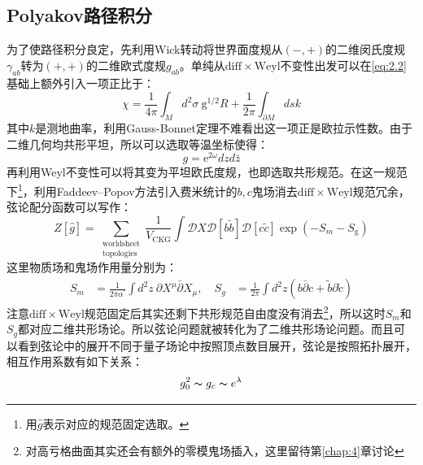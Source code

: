 \subsection{Polyakov路径积分}
为了使路径积分良定，先利用Wick转动将世界面度规从$(-,+)$的二维闵氏度规$\gamma_{ab}$转为$(+,+)$的二维欧式度规$g_{ab}$。单纯从$\mathrm{diff}\times\mathrm{Weyl}$不变性出发可以在\ref{eq:2.2}基础上额外引入一项正比于：
\begin{equation}
	\chi=\frac{1}{4\pi}\int_Md^2\sigma\mathrm{~g}^{1/2}R+\frac{1}{2\pi}\int_{\partial M}dsk
\end{equation}
其中$k$是测地曲率，利用Gauss-Bonnet定理不难看出这一项正是欧拉示性数。由于二维几何均共形平坦，所以可以选取等温坐标使得：
\begin{equation}
	\label{eq:2.30}
	g = \mathrm{e}^{2\omega} dz d\bar z
\end{equation}
再利用Weyl不变性可以将其变为平坦欧氏度规，也即选取共形规范。在这一规范下\footnote{用$\hat g$表示对应的规范固定选取。}，利用Faddeev–Popov方法引入费米统计的$b,c$鬼场消去$\mathrm{diff}\times\mathrm{Weyl}$规范冗余，弦论配分函数可以写作：
\begin{equation}
	\label{eq:2.31}
	Z\left[\hat{g}\right]=\sum_{\substack{\text{worldsheet}\\\text{topologies}}}\frac{1}{V_{\mathrm{CKG}}}\int\mathcal{D}X\mathcal{D}[b\tilde{b}]\mathcal{D}[c\tilde{c}]\exp(-S_m-S_\mathrm{g})
\end{equation}
这里物质场和鬼场作用量分别为：
\begin{equation}
	\label{eq:2.32}
	\begin{aligned}
		S_m&=\frac{1}{2\pi\alpha^{\prime}}\int d^2z\mathrm{~}\partial X^\mu\bar{\partial}X_\mu,\quad
		S_g&=\frac{1}{2\pi}\int d^2z\left(b\bar\partial c+\tilde b\partial \tilde c\right)
	\end{aligned}
\end{equation}
注意$\mathrm{diff}\times\mathrm{Weyl}$规范固定后其实还剩下共形规范自由度没有消去\footnote{对高亏格曲面其实还会有额外的零模鬼场插入，这里留待第\ref{chap:4}章讨论}，所以这时$S_m$和$S_g$都对应二维共形场论。所以弦论问题就被转化为了二维共形场论问题。而且可以看到弦论中的展开不同于量子场论中按照顶点数目展开，弦论是按照拓扑展开，相互作用系数有如下关系：
\begin{equation}
	g_0^2\thicksim g_c\thicksim e^\lambda
\end{equation}

